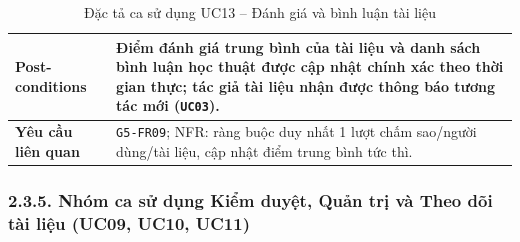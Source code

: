 \begin{table}[H]
\begin{tabularx}{\textwidth}{|p{3.5cm}|X|}
\hline
\textbf{Post-conditions} & Điểm đánh giá trung bình của tài liệu và danh sách bình luận học thuật được cập nhật chính xác theo thời gian thực; tác giả tài liệu nhận được thông báo tương tác mới (\texttt{UC03}). \\
\hline
\textbf{Yêu cầu liên quan} & \texttt{G5-FR09}; NFR: ràng buộc duy nhất 1 lượt chấm sao/người dùng/tài liệu, cập nhật điểm trung bình tức thì. \\
\hline
\end{tabularx}
\caption{Đặc tả ca sử dụng UC13 -- Đánh giá và bình luận tài liệu}
\label{tab:uc13}
\end{table}


\subsubsection{2.3.5. Nhóm ca sử dụng Kiểm duyệt, Quản trị và Theo dõi tài liệu (UC09, UC10, UC11)}

